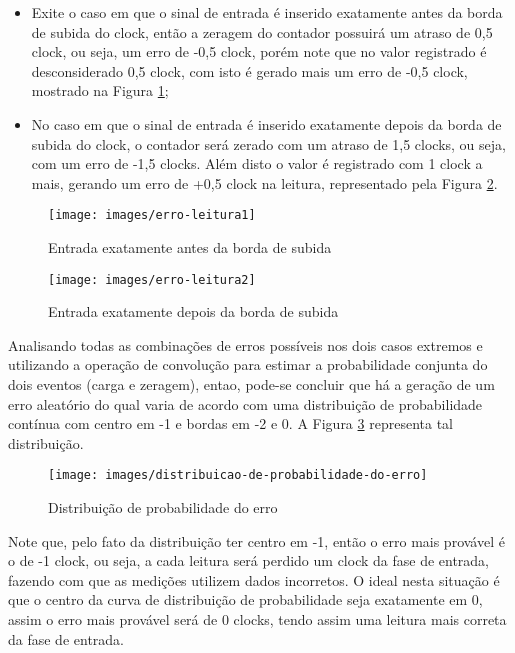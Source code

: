 \documentclass[12pt,a4paper,openany]{abntex2}
\begin{document}
\begin{itemize}	
	\item Exite o caso em que o sinal de entrada é inserido exatamente antes da borda de subida do clock, então a zeragem do contador possuirá um atraso de 0,5 clock, ou seja, um erro de -0,5 clock, porém note que no valor registrado é desconsiderado 0,5 clock, com isto é gerado mais um erro de -0,5 clock, mostrado na Figura \ref{fig:erro-leitura1};
\end{itemize}


\begin{itemize}	
	\item No caso em que o sinal de entrada é inserido exatamente depois da borda de subida do clock, o contador será zerado com um atraso de 1,5 clocks, ou seja, com um erro de -1,5 clocks. Além disto o valor é registrado com 1 clock a mais, gerando um erro de +0,5 clock na leitura, representado pela Figura \ref{fig:erro-leitura2}.
\end{itemize}

\begin{figure}[!htp]
	\centering
	\caption{Entrada exatamente antes da borda de subida}
	\texttt{[image: images/erro-leitura1]}
	\label{fig:erro-leitura1}
\end{figure}

\begin{figure}[!htp]
	\centering
	\caption{Entrada exatamente depois da borda de subida}
	\texttt{[image: images/erro-leitura2]}
	\label{fig:erro-leitura2}
\end{figure}

Analisando todas as combinações de erros possíveis nos dois casos extremos e utilizando a operação de convolução para estimar a probabilidade conjunta do dois eventos (carga e zeragem), entao, pode-se concluir que há a geração de um erro aleatório do qual varia de acordo com uma distribuição de probabilidade contínua com centro em -1 e bordas em -2 e 0. A Figura \ref{fig:distribuicao-de-probabilidade-do-erro} representa tal distribuição.

\begin{figure}[!htp]
	\centering
	\caption{Distribuição de probabilidade do erro}
	\texttt{[image: images/distribuicao-de-probabilidade-do-erro]}
	\label{fig:distribuicao-de-probabilidade-do-erro}
\end{figure}

Note que, pelo fato da distribuição ter centro em -1, então o erro mais provável é o de -1 clock, ou seja, a cada leitura será perdido um clock da fase de entrada, fazendo com que as medições utilizem dados incorretos. O ideal nesta situação é que o centro da curva de distribuição de probabilidade seja exatamente em 0, assim o erro mais provável será de 0 clocks, tendo assim uma leitura mais correta da fase de entrada.
\end{document}
